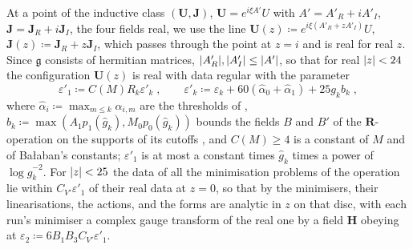 \documentclass[11pt]{preprint}
\DeclarePairedDelimiter{\abs}{\lvert}{\rvert}
\numberwithin{equation}{section}
\theoremstyle{definition}
\theoremstyle{remark}
\theoremstyle{plain}
\begin{document}
At a point of the inductive class $(\mathbf U, \mathbf J)$, $\mathbf U = e^{i\xi A'}U$ with $A' = A'_R + iA'_I$, $\mathbf J = \mathbf J_R + i\mathbf J_I$, the four fields real, we use the line $\mathbf U(z) \coloneqq e^{i\xi(A'_R + zA'_I)}U$, $\mathbf J(z) \coloneqq \mathbf J_R + z\mathbf J_I$, which passes through the point at $z = i$ and is real for real $z$. Since $\mathfrak g$ consists of hermitian matrices, $\abs{A'_R}, \abs{A'_I} \leq \abs{A'}$, so that for real $\abs z < 24$ the configuration $\mathbf U(z)$ is real with data regular with the parameter
\begin{equation}\label{eq:complex-data-parameter}
    \varepsilon'_1 \coloneqq C(M)R_k\varepsilon'_k\;,
    \qquad
    \varepsilon'_k \coloneqq \varepsilon_k + 60(\hat\alpha_0 + \hat\alpha_1) + 25g_kb_k\;,
\end{equation}
where $\hat\alpha_i \coloneqq \max_{m \leq k}\alpha_{i,m}$ are the thresholds of \cite[(2.28), p.~259]{BalabanCRE}, $b_k \coloneqq \max(A_1p_1(\hat g_k), M_0p_0(\hat g_k))$ bounds the fields $B$ and $B'$ of the $\mathbf R$-operation on the supports of its cutoffs \cite[p.~356, p.~360]{BalabanLFR2}, and $C(M) \geq 4$ is a constant of $M$ and of Ba{\l}aban's constants; $\varepsilon'_1$ is at most a constant times $\hat g_k$ times a power of $\log\hat g_k^{-2}$. For $\abs z < 25$ the data of all the minimisation problems of the operation lie within $C_{V'}\varepsilon'_1$ of their real data at $z = 0$, so that by \cite[Sect.~G, Proposition~9]{BalabanVAR} the minimisers, their linearisations, the actions, and the forms are analytic in $z$ on that disc, with each run's minimiser a complex gauge transform of the real one by a field $\mathbf H$ obeying \cite[(19)]{BalabanVAR} at $\varepsilon_2 \coloneqq 6B_1B_3C_{V'}\varepsilon'_1$.
\end{document}
